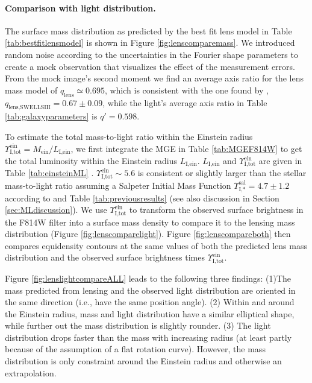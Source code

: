 

\paragraph{Comparison with light distribution.} The surface mass distribution as predicted by the best fit lens model in Table \ref{tab:bestfitlensmodel} is shown in Figure \ref{fig:lenscomparemass}. We introduced random noise according to the uncertainties in the Fourier shape parameters to create a mock observation that visualizes the effect of the measurement errors. From the mock image's second moment we find an average axis ratio for the lens mass model of $q_\text{lens} \simeq 0.695$, which is consistent with the one found by \citet{SWELLSIII}, $q_\text{lens,SWELLSIII} = 0.67 \pm 0.09$, while the light's average axis ratio in Table \ref{tab:galaxyparameters} is $q' = 0.598$.

To estimate the total mass-to-light ratio within the Einstein radius $\Upsilon_\text{I,tot}^\text{ein} = M_\text{ein} / L_\text{I,ein}$, we first integrate the MGE in Table \ref{tab:MGEF814W} to get the total luminosity within the Einstein radius $L_\text{I,ein}$. $L_\text{I,ein}$ and $\Upsilon_\text{I,tot}^\text{ein}$ are given in Table \ref{tab:einsteinML} . $\Upsilon_\text{I,tot}^\text{ein} \sim 5.6$ is consistent or slightly larger than the stellar mass-to-light ratio assuming a Salpeter Initial Mass Function $\Upsilon_\text{I,*}^\text{sal} = 4.7 \pm 1.2$ according to \citet{SWELLSI} and Table \ref{tab:previousresults} (see also discussion in Section \ref{sec:MLdiscussion}). We use $\Upsilon_\text{I,tot}^\text{ein}$ to transform the observed surface brightness in the F814W filter into a surface mass density to compare it to the lensing mass distribution (Figure \ref{fig:lenscomparelight}). Figure \ref{fig:lenscompareboth} then compares equidensity contours at the same values of both the predicted lens mass distribution and the observed surface brightness times $\Upsilon_\text{I,tot}^\text{ein}$.

Figure \ref{fig:lenslightcompareALL} leads to the following three findings: (1)The mass predicted from lensing and the observed light distribution are oriented in the same direction (i.e., have the same position angle). (2) Within and around the Einstein radius, mass and light distribution have a similar elliptical shape, while further out the mass distribution is slightly rounder. (3) The light distribution drops faster than the mass with increasing radius (at least partly because of the assumption of a flat rotation curve). However, the mass distribution is only constraint around the Einstein radius and otherwise an extrapolation. 

